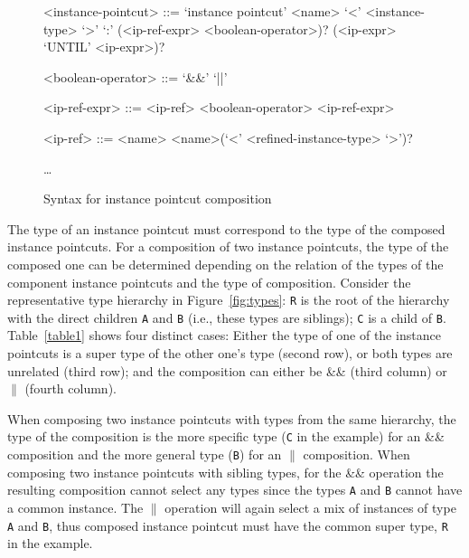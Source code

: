 \documentclass{llncs}
\begin{document}
\begin{figure}[h]
\begin{grammar}
<instance-pointcut> ::= `instance pointcut' <name> `<' <instance-type> `>' `:'
(<ip-ref-expr> <boolean-operator>)? (<ip-expr> `UNTIL' <ip-expr>)? 

<boolean-operator> ::= `&&' \alt `||'

<ip-ref-expr> ::= <ip-ref>  <boolean-operator> <ip-ref-expr> 

<ip-ref> ::= <name> \alt <name>(`<' <refined-instance-type> `>')?

\ldots
\end{grammar}
\caption{Syntax for instance pointcut composition}
\label{fig:grammar2}
\end{figure}


The type of an instance pointcut must correspond to the type of the composed instance pointcuts. For a composition of two instance pointcuts, the type of the composed one can be determined depending on the relation of the types of the component instance pointcuts and the type of composition. Consider the representative type hierarchy in Figure~\ref{fig:types}: \texttt{R} is the root of the hierarchy with the direct children \texttt{A} and \texttt{B} (i.e., these types are siblings); \texttt{C} is a child of \texttt{B}. Table~\ref{table1} shows four distinct cases: Either the type of one of the instance pointcuts is a super type of the other one's type (second row), or both types are unrelated (third row); and the composition can either be \&\& (third column) or $\|$ (fourth column).

When composing two instance pointcuts with types from the same hierarchy, the type of the composition is the more specific type (\texttt{C} in the example) for an \&\& composition and the more general type (\texttt{B}) for an $\|$ composition.
When composing two instance pointcuts with sibling types, for the \&\& operation the resulting composition cannot select any types since the types \texttt{A} and \texttt{B} cannot have a common instance. The $\|$ operation will again select a mix of instances of type \texttt{A} and \texttt{B}, thus composed instance pointcut must have the common super type, \texttt{R} in the example.
\end{document}
